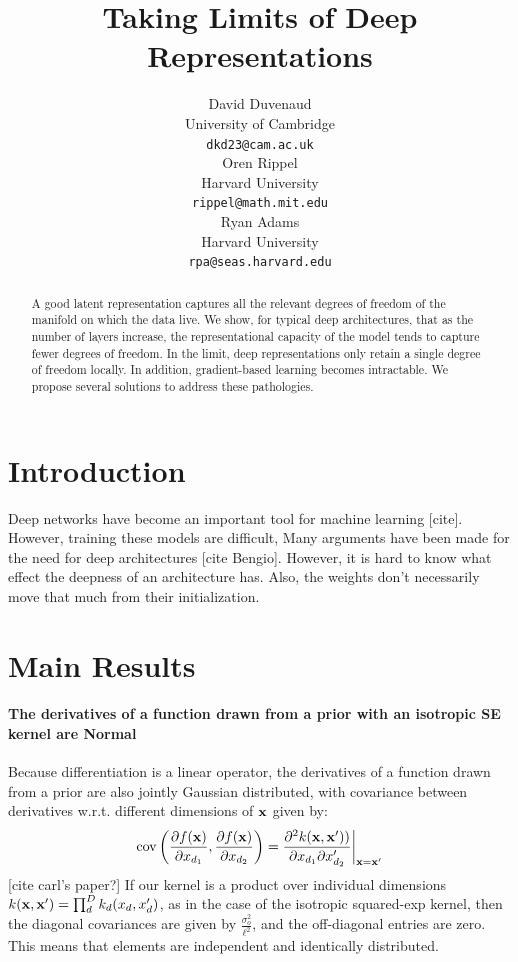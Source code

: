 \documentclass{article}
\title{Taking Limits of Deep Representations}
\author{
David Duvenaud \\
University of Cambridge \\
\texttt{dkd23@cam.ac.uk} \\
\And
Oren Rippel \\
Harvard University \\
\texttt{rippel@math.mit.edu} \\
\And
Ryan Adams \\
Harvard University \\
\texttt{rpa@seas.harvard.edu} \\
}
\begin{document}
\maketitle

\begin{abstract}
A good latent representation captures all the relevant degrees of freedom of the manifold on which the data live.  We show, for typical deep architectures, that as the number of layers increase, the representational capacity of the model tends to capture fewer degrees of freedom.  In the limit, deep representations only retain a single degree of freedom locally.  In addition, gradient-based learning becomes intractable.  We propose several solutions to address these pathologies.
\end{abstract}

\section{Introduction}

Deep networks have become an important tool for machine learning [cite].  However, training these models are difficult, Many arguments have been made for the need for deep architectures [cite Bengio].  However, it is hard to know what effect the deepness of an architecture has.  Also, the weights don't necessarily move that much from their initialization.




\section{Main Results}

\paragraph{The derivatives of a function drawn from a \gp{} prior with an isotropic SE kernel are \iid Normal}

Because differentiation is a linear operator, the derivatives of a function drawn from a \gp{} prior are also jointly Gaussian distributed, with covariance between derivatives w.r.t. different dimensions of ${\bf{x}}$ given by:
%
\begin{align}
\operatorname{cov} \left( \frac{\partial f({\bf{x}})}{\partial x_{d_1}}, \frac{\partial f({\bf{x}})}{\partial x_{d_2}} \right) =
\frac{\partial^2 k({\bf{x}}, {\bf{x}}'))}{\partial x_{d_1} \partial x_{d_2}'} \bigg|_{{\bf{x}}={\bf{x}}'}
\end{align}
%
[cite carl's paper?] 
%
If our kernel is a product over individual dimensions $k({\bf{x}}, {\bf{x}}') = \prod_d^D k_d(x_d, x_d')$, as in the case of the isotropic squared-exp kernel, then the diagonal covariances are given by $\frac{\sigma_o^2}{\ell^2}$, and the off-diagonal entries are zero.  This means that elements are independent and identically distributed.
\end{document}
